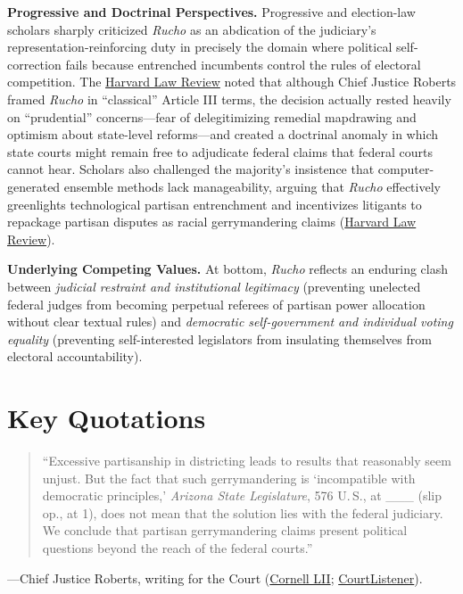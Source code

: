 \documentclass[12pt]{article}
\begin{document}
\textbf{Progressive and Doctrinal Perspectives.} Progressive and election-law scholars sharply criticized \textit{Rucho} as an abdication of the judiciary's representation-reinforcing duty in precisely the domain where political self-correction fails because entrenched incumbents control the rules of electoral competition. The \href{https://harvardlawreview.org/print/vol-133/rucho-v-common-cause/}{Harvard Law Review} noted that although Chief Justice Roberts framed \textit{Rucho} in ``classical'' Article III terms, the decision actually rested heavily on ``prudential'' concerns---fear of delegitimizing remedial mapdrawing and optimism about state-level reforms---and created a doctrinal anomaly in which state courts might remain free to adjudicate federal claims that federal courts cannot hear. Scholars also challenged the majority's insistence that computer-generated ensemble methods lack manageability, arguing that \textit{Rucho} effectively greenlights technological partisan entrenchment and incentivizes litigants to repackage partisan disputes as racial gerrymandering claims (\href{https://harvardlawreview.org/print/vol-133/rucho-v-common-cause/}{Harvard Law Review}).

\textbf{Underlying Competing Values.} At bottom, \textit{Rucho} reflects an enduring clash between \textit{judicial restraint and institutional legitimacy} (preventing unelected federal judges from becoming perpetual referees of partisan power allocation without clear textual rules) and \textit{democratic self-government and individual voting equality} (preventing self-interested legislators from insulating themselves from electoral accountability).

\section{Key Quotations}

\begin{quote}
``Excessive partisanship in districting leads to results that reasonably seem unjust. But the fact that such gerrymandering is `incompatible with democratic principles,' \textit{Arizona State Legislature}, 576 U.\,S., at \_\_\_ (slip op., at 1), does not mean that the solution lies with the federal judiciary. We conclude that partisan gerrymandering claims present political questions beyond the reach of the federal courts.''
\end{quote}
\noindent---Chief Justice Roberts, writing for the Court (\href{https://www.law.cornell.edu/supremecourt/text/18-422}{Cornell LII}; \href{https://www.courtlistener.com/opinion/4633469/rucho-v-common-cause/}{CourtListener}).
\end{document}
